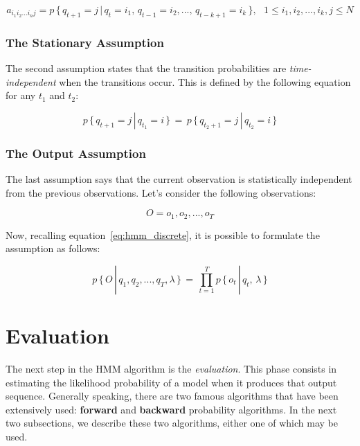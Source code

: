 \begin{equation}
\label{eq:transition_nth_order}
a_{i_{1}i_{2}...i_{n}j} = p\, \{\, q_{t+1} = j \,|\, q_{t} = i_{1}, \, q_{t-1} = i_{2}, ... , \, q_{t-k+1} = i_{k} \, \}, \,\,\,\, 1 \leq i_{1},i_{2}, ... ,i_{k}, j \leq N
\end{equation}


\subsubsection{The Stationary Assumption}
The second assumption states that the transition probabilities are \textit{time-independent} when the transitions occur. This is defined by the following equation for any $t_{1}$ and $t_{2}$:

\begin{equation}
	p \, \{\, q_{t+1} = j \,|\, q_{t_{1}} = i\, \}\, = \,p \,\{\, q_{t_{2}+1} = j \,|\, q_{t_{2}} = i\, \}
\end{equation}

\subsubsection{The Output Assumption}
The last assumption says that the current observation is statistically independent from the previous observations. Let's consider the following observations:

\begin{equation}
	O = o_{1}, o_{2}, ... , o_{T}
\end{equation}

\noindent Now, recalling equation~\ref{eq:hmm_discrete}, it is possible to formulate the assumption as follows:

\begin{equation}
\label{eq:final_hmm}
	p \, \{\, O \, |\, q_{1},q_{2}, ... , q_{T}, \lambda \,\}\, = \, \prod_{t = 1}^{T} p \, \{ \, o_{t} \, | \, q_{t}, \, \lambda \,\}
\end{equation}

\section{Evaluation}
The next step in the HMM algorithm is the \textit{evaluation}. This phase consists in estimating the likelihood probability of a model when it produces that output sequence. Generally speaking, there are two famous algorithms that have been extensively used: \textbf{forward} and \textbf{backward} probability algorithms. In the next two subsections, we describe these two algorithms, either one of which may be used.

